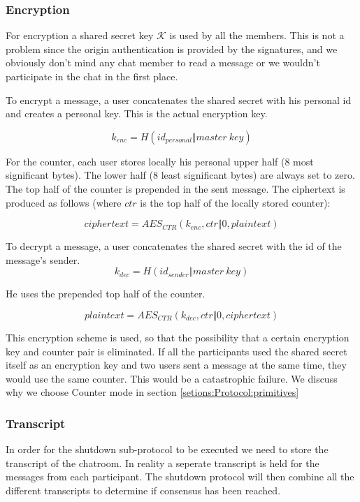 \subsubsection{Encryption}

For encryption a shared secret key $\mathcal{K}$ is used by all the members. This is not a problem since the origin authentication is provided by the signatures, and we obviously don't mind any chat member to read a message or we wouldn't participate in the chat in the first place.

To encrypt a message, a user concatenates the shared secret with his personal id and creates a personal key.
This is the actual encryption key.

\[
k_{enc} = H(id_{personal} \Vert master\ key)
\]

For the counter, each user stores locally his personal upper half (8 most significant bytes).
The lower half (8 least significant bytes) are always set to zero.
The top half of the counter is prepended in the sent message.
The ciphertext is produced as follows (where $ctr$ is the top half of the locally stored counter):

\[
ciphertext = AES_{CTR}(k_{enc}, ctr \Vert 0, plaintext)
\]

To decrypt a message, a user concatenates the shared secret with the id of the message's sender.
\[
k_{dec} = H(id_{sender} \Vert master\ key)
\]

He uses the prepended top half of the counter.

\[
plaintext = AES_{CTR}(k_{dec}, ctr \Vert 0, ciphertext)
\]

This encryption scheme is used, so that the possibility that a certain encryption key and counter pair is eliminated.
If all the participants used the shared secret itself as an encryption key and two users sent a message at the same time, they would use the same counter.
This would be a catastrophic failure.
We discuss why we choose Counter mode in section \ref{setions:Protocol:primitives}

\subsubsection{Transcript}
In order for the shutdown sub-protocol to be executed we need to store the transcript of the chatroom. In reality a seperate transcript is held for the messages from each participant.
The shutdown protocol will then combine all the different transcripts to determine if consensus has been reached.

